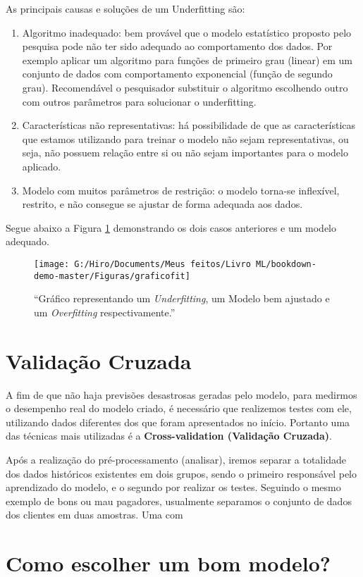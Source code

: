 \documentclass[
]{book}
\begin{document}
As principais causas e soluções de um Underfitting são:

\begin{enumerate}
\def\labelenumi{\arabic{enumi}.}
\item
  Algoritmo inadequado: bem provável que o modelo estatístico proposto pelo pesquisa pode não ter sido adequado ao comportamento dos dados. Por exemplo aplicar um algoritmo para funções de primeiro grau (linear) em um conjunto de dados com comportamento exponencial (função de segundo grau). Recomendável o pesquisador substituir o algoritmo escolhendo outro com outros parâmetros para solucionar o underfitting.
\item
  Características não representativas: há possibilidade de que as características que estamos utilizando para treinar o modelo não sejam representativas, ou seja, não possuem relação entre si ou não sejam importantes para o modelo aplicado.
\item
  Modelo com muitos parâmetros de restrição: o modelo torna-se inflexível, restrito, e não consegue se ajustar de forma adequada aos dados.
\end{enumerate}

Segue abaixo a Figura \ref{fig:graficofit} demonstrando os dois casos anteriores e um modelo adequado.

\begin{figure}

{\centering \texttt{[image: G:/Hiro/Documents/Meus feitos/Livro ML/bookdown-demo-master/Figuras/graficofit]} 

}

\caption{``Gráfico representando um \emph{Underfitting}, um Modelo bem ajustado e um \emph{Overfitting} respectivamente.''}\label{fig:graficofit}
\end{figure}



\hypertarget{validauxe7uxe3o-cruzada}{%
\section{Validação Cruzada}\label{validauxe7uxe3o-cruzada}}

A fim de que não haja previsões desastrosas geradas pelo modelo, para medirmos o desempenho real do modelo criado, é necessário que realizemos testes com ele, utilizando dados diferentes dos que foram apresentados no início. Portanto uma das técnicas mais utilizadas é a \textbf{Cross-validation (Validação Cruzada)}.

Após a realização do pré-processamento (analisar), iremos separar a totalidade dos dados históricos existentes em dois grupos, sendo o primeiro responsável pelo aprendizado do modelo, e o segundo por realizar os testes.
Seguindo o mesmo exemplo de bons ou mau pagadores, usualmente separamos o conjunto de dados dos clientes em duas amostras. Uma com

\hypertarget{como-escolher-um-bom-modelo}{%
\section{Como escolher um bom modelo?}\label{como-escolher-um-bom-modelo}}

  
\end{document}
